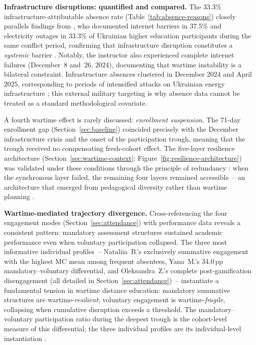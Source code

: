 \textbf{Infrastructure disruptions: quantified and compared.} The 33.3\% infrastructure-attributable absence rate (Table~\ref{tab:absence-reasons}) closely parallels findings from \cite{Semeniv2025}, who documented internet barriers in 37.5\% and electricity outages in 33.3\% of Ukrainian higher education participants during the same conflict period, confirming that infrastructure disruption constitutes a \emph{systemic} barrier \cite{Martynets202428, Vovchasta2024}. Notably, the instructor also experienced complete internet failures (December~8 and~26, 2024), documenting that wartime instability is a bilateral constraint. Infrastructure absences clustered in December 2024 and April 2025, corresponding to periods of intensified attacks on Ukrainian energy infrastructure \cite{Humeniuk2022113}; this external military targeting is why absence data cannot be treated as a standard methodological covariate.

A fourth wartime effect is rarely discussed: \emph{enrollment suspension}. The 71-day enrollment gap (Section~\ref{sec:baseline}) coincided precisely with the December infrastructure crisis and the onset of the participation trough, meaning that the trough received no compensating fresh-cohort effect. The five-layer resilience architecture (Section~\ref{sec:wartime-context}; Figure~\ref{fig:resilience-architecture}) was validated under these conditions through the principle of redundancy \cite{Tamim2011}: when the synchronous layer failed, the remaining four layers remained accessible~-- an architecture that emerged from pedagogical diversity rather than wartime planning \cite{Hlianenko2024, Zamkova2023299}.

\textbf{Wartime-mediated trajectory divergence.} Cross-referencing the four engagement modes (Section~\ref{sec:attendance}) with performance data reveals a consistent pattern: mandatory assessment structures sustained academic performance even when voluntary participation collapsed. The three most informative individual profiles~-- Nataliia~B.'s exclusively summative engagement with the highest MC mean among frequent absentees, Yana~M.'s 34.0\,pp mandatory--voluntary differential, and Oleksandra~Z.'s complete post-gamification disengagement (all detailed in Section~\ref{sec:attendance})~-- instantiate a fundamental tension in wartime distance education: mandatory summative structures are wartime-\emph{resilient}; voluntary engagement is wartime-\emph{fragile}, collapsing when cumulative disruption exceeds a threshold. The mandatory--voluntary participation ratio during the deepest trough is the cohort-level measure of this differential; the three individual profiles are its individual-level instantiation \cite{Martynets202428}.

